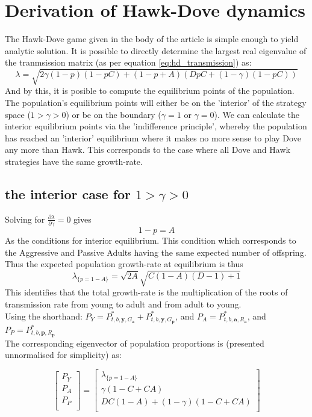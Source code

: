 \section{Derivation of Hawk-Dove dynamics}\label{appendix3}

The Hawk-Dove game given in the body of the article is simple enough to yield analytic solution.
It is possible to directly determine the largest real eigenvalue of the tranmsission matrix (as per equation \ref{eq:hd_transmission}) as: $$ \lambda = \sqrt{2\gamma(1-p)(1-pC)+(1-p+A)(DpC+(1-\gamma)(1-pC))} $$
And by this, it is posible to compute the equilibrium points of the population. The population's equilibrium points will either be on the 'interior' of the strategy space ($1>\gamma >0$) or be on the boundary ($\gamma=1$ or $\gamma=0$).
We can calculate the interior equilibrium points via the 'indifference principle'\cite{markov5}, whereby the population has reached an 'interior' equilibrium where it makes no more sense to play Dove any more than Hawk. This corresponds to the case where all Dove and Hawk strategies have the same growth-rate.

\subsection{the interior case for $1>\gamma >0$}

Solving for $\frac{\partial \lambda}{\partial \gamma}=0$ gives $$ 1-p=A $$ As the conditions for interior equilibrium.  This condition which corresponds to the Aggressive and Passive Adults having the same expected number of offspring.
Thus the expected population growth-rate at equilibrium is thus $$\lambda_{\{p=1-A\}} = \sqrt{2A}\sqrt{C(1-A)(D-1)+1}$$ This identifies that the total growth-rate is the multiplication of the roots of transmission rate from young to adult and from adult to young.\\
Using the shorthand: $P_Y=P^*_{t,b,\mathbf{y},G_{\mathbf{a}}}+P^*_{t,b,\mathbf{y},G_{\mathbf{p}}}$, and $P_A=P^*_{t,b,\mathbf{a},R_{\mathbf{a}}}$, and $P_P=P^*_{t,b,\mathbf{p},R_{\mathbf{p}}}$\\
The corresponding eigenvector of population proportions is (presented unnormalised for simplicity) as:

$$ \begin{bmatrix}
    P_Y \\
    P_A \\
    P_P \\
\end{bmatrix} = \begin{bmatrix}
    \lambda_{\{p=1-A\}} \\
    \gamma(1-C+CA) \\
    DC(1-A) + (1-\gamma)(1-C+CA) \\
\end{bmatrix} $$

